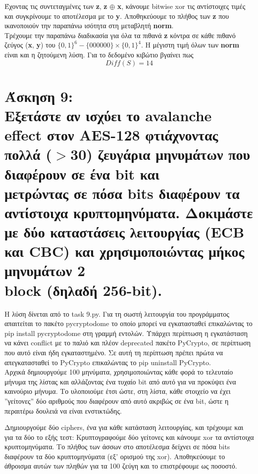\documentclass{article}
\newcommand{\lt}[1]{\latintext #1\greektext}
\newcommand{\task}[2]{\newpage\section*{Άσκηση #1:\\#2}}
\newcommand{\blt}[1]{\lt{\textbf{#1}}}
\begin{document}
Έχοντας τις συντεταγμένες των \blt{z}, \blt{z} $\oplus$ \blt{x}, κάνουμε \lt{bitwise xor} τις αντίστοιχες τιμές και συγκρίνουμε το αποτέλεσμα με το \blt{y}. Αποθηκεύουμε το πλήθος των \blt{z} που ικανοποιούν την παραπάνω ισότητα στη μεταβλητή \blt{norm}.\\

Τρέχουμε την παραπάνω διαδικασία για όλα τα πιθανά \blt{z} κόντρα σε κάθε πιθανό ζεύγος (\blt{x}, \blt{y}) του $\{0,1\}^6 - \{000000\} \times \{0,1\}^4$. Η μέγιστη τιμή όλων των \blt{norm} είναι και η ζητούμενη λύση.
Για το δεδομένο κιβώτιο βγαίνει πως
\begin{equation*}
    Diff(S) = 14
\end{equation*}

\task{9}{
    Εξετάστε αν ισχύει το \lt{avalanche effect} στον \lt{AES-128} φτιάχνοντας πολλά ($>$30) ζευγάρια μηνυμάτων που διαφέρουν σε ένα \lt{bit} και\\ μετρώντας σε πόσα \lt{bits} διαφέρουν τα\\ αντίστοιχα κρυπτομηνύματα. Δοκιμάστε με δύο καταστάσεις λειτουργίας (\lt{ECB} και \lt{CBC}) και χρησιμοποιώντας μήκος μηνυμάτων 2\\ \lt{block} (δηλαδή 256-\lt{bit}).
}

Η λύση δίνεται από το \lt{task 9.py}. Για τη σωστή λειτουργία του προγράμματος απαιτείται το πακέτο \lt{pycryptodome} το οποίο μπορεί να εγκατασταθεί επικαλώντας το \lt{pip install pycryptodome} στη γραμμή εντολών. Υπάρχει περίπτωση η εγκατάσταση να κάνει \lt{conflict} με το παλιό και πλέον \lt{deprecated} πακέτο \lt{PyCrypto}, σε περίπτωση που αυτό είναι ήδη εγκαταστημένο. Σε αυτή τη περίπτωση πρέπει πρώτα να\\ απεγκατασταθεί το \lt{PyCrypto} επικαλώντας το \lt{pip uninstall PyCrypto}.\\

Αρχικά δημιουργούμε 100 μηνύματα, χρησιμοποιώντας κάθε φορά το τελευταίο μήνυμα της λίστας και αλλάζοντας ένα τυχαίο \lt{bit} από αυτό για να προκύψει ένα καινούριο μήνυμα. Το υλοποιούμε έτσι ώστε, στη λίστα, κάθε στοιχείο να έχει ''γείτονες'' δύο αριθμούς που διαφέρουν από αυτό ακριβώς σε ένα \lt{bit}, ώστε η περαιτέρω δουλειά να είναι ενστικτώδης.\\

\newpage

Δημιουργούμε δύο \lt{ciphers}, ένα για κάθε κατάσταση λειτουργίας, και τρέχουμε και για τα δύο το εξής τεστ: Κρυπτογραφούμε δύο γείτονες και κάνουμε \lt{xor} τα αντίστοιχα κρυπτομηνύματα. Το πλήθος των άσσων στο αποτέλεσμα δείχνει σε πόσα \lt{bits} διαφέρουν τα δύο κρυπτομηνύματα (εξ' ορισμού της \lt{xor}). Αποθηκεύουμε το άθροισμα αυτών των πληθών για τα 100 ζεύγη και το επιστρέφουμε ως ποσοστό.\\
\end{document}
